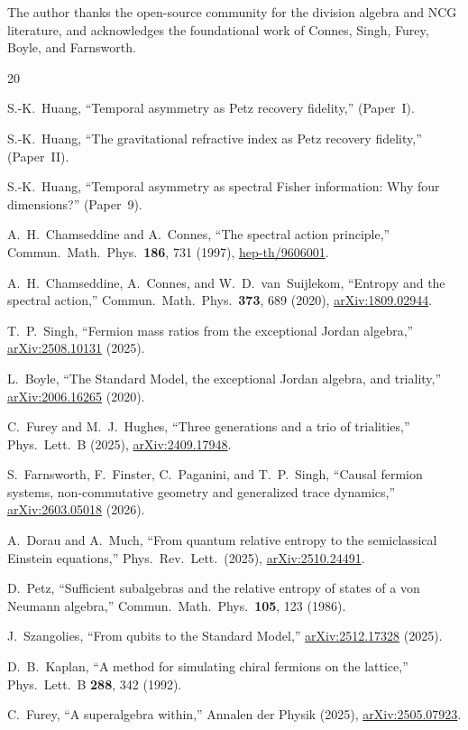 \documentclass[prl,twocolumn,superscriptaddress,longbibliography]{revtex4-2}
\begin{document}
\begin{acknowledgments}
The author thanks the open-source community for the
division algebra and NCG literature, and acknowledges
the foundational work of Connes, Singh, Furey, Boyle,
and Farnsworth.
\end{acknowledgments}


\begin{thebibliography}{20}

S.-K.~Huang, ``Temporal asymmetry as Petz recovery
fidelity,'' (Paper~I).

S.-K.~Huang, ``The gravitational refractive index as
Petz recovery fidelity,'' (Paper~II).

S.-K.~Huang, ``Temporal asymmetry as spectral Fisher
information: Why four dimensions?'' (Paper~9).

A.~H.~Chamseddine and A.~Connes,
``The spectral action principle,''
Commun.\ Math.\ Phys.\  \textbf{186}, 731 (1997),
\href{https://arxiv.org/abs/hep-th/9606001}{hep-th/9606001}.

A.~H.~Chamseddine, A.~Connes, and
W.~D.~van~Suijlekom,
``Entropy and the spectral action,''
Commun.\ Math.\ Phys.\  \textbf{373}, 689 (2020),
\href{https://arxiv.org/abs/1809.02944}{arXiv:1809.02944}.

T.~P.~Singh,
``Fermion mass ratios from the exceptional Jordan
algebra,''
\href{https://arxiv.org/abs/2508.10131}{arXiv:2508.10131}
(2025).

L.~Boyle,
``The Standard Model, the exceptional Jordan algebra,
and triality,''
\href{https://arxiv.org/abs/2006.16265}{arXiv:2006.16265}
(2020).

C.~Furey and M.~J.~Hughes,
``Three generations and a trio of trialities,''
Phys.\ Lett.\ B (2025),
\href{https://arxiv.org/abs/2409.17948}{arXiv:2409.17948}.

S.~Farnsworth, F.~Finster, C.~Paganini, and
T.~P.~Singh,
``Causal fermion systems, non-commutative geometry and
generalized trace dynamics,''
\href{https://arxiv.org/abs/2603.05018}{arXiv:2603.05018}
(2026).

A.~Dorau and A.~Much,
``From quantum relative entropy to the semiclassical
Einstein equations,''
Phys.\ Rev.\ Lett.\  (2025),
\href{https://arxiv.org/abs/2510.24491}{arXiv:2510.24491}.

D.~Petz,
``Sufficient subalgebras and the relative entropy of
states of a von Neumann algebra,''
Commun.\ Math.\ Phys.\  \textbf{105}, 123 (1986).

J.~Szangolies,
``From qubits to the Standard Model,''
\href{https://arxiv.org/abs/2512.17328}{arXiv:2512.17328}
(2025).

D.~B.~Kaplan,
``A method for simulating chiral fermions on the
lattice,''
Phys.\ Lett.\ B \textbf{288}, 342 (1992).

C.~Furey,
``A superalgebra within,''
Annalen der Physik (2025),
\href{https://arxiv.org/abs/2505.07923}{arXiv:2505.07923}.

\end{thebibliography}
\end{document}
